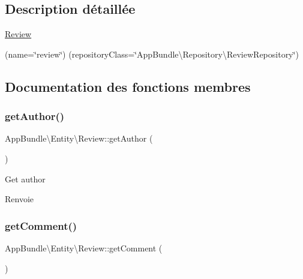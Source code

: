 \subsection{Description détaillée}
\hyperlink{classAppBundle_1_1Entity_1_1Review}{Review}

(name=\char`\"{}review\char`\"{}) (repository\+Class=\char`\"{}\+App\+Bundle\textbackslash{}\+Repository\textbackslash{}\+Review\+Repository\char`\"{}) 

\subsection{Documentation des fonctions membres}
\mbox{\label{classAppBundle_1_1Entity_1_1Review_a4cd28ac8bbe58dfc98e5a65b04235d88}} 
\subsubsection{\texorpdfstring{get\+Author()}{getAuthor()}}
{\footnotesize\ttfamily App\+Bundle\textbackslash{}\+Entity\textbackslash{}\+Review\+::get\+Author (\begin{DoxyParamCaption}{ }\end{DoxyParamCaption})}

Get author

\begin{DoxyReturn}{Renvoie}

\end{DoxyReturn}
\mbox{\label{classAppBundle_1_1Entity_1_1Review_afcf5bbea14b6c5ab6c4176626c71351c}} 
\subsubsection{\texorpdfstring{get\+Comment()}{getComment()}}
{\footnotesize\ttfamily App\+Bundle\textbackslash{}\+Entity\textbackslash{}\+Review\+::get\+Comment (\begin{DoxyParamCaption}{ }\end{DoxyParamCaption})}

